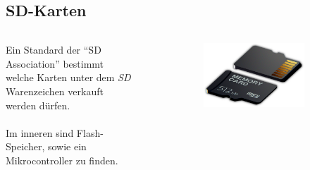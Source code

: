 \documentclass[ngerman]{schoolPres}
\begin{document}
  \subsection{SD-Karten}%
  \begin{frame}
    \begin{columns}[c]
      \begin{column}{.6\linewidth}
        Ein Standard der \enquote{SD Association} bestimmt welche Karten unter dem \emph{SD} Warenzeichen verkauft werden dürfen.\\~\\

        Im inneren sind Flash-Speicher, sowie ein Mikrocontroller zu finden.
      \end{column}
      \begin{column}{.4\linewidth}
        \begin{figure}[!ht]
          \centering
          \begin{subfigure}{.65\linewidth}
            \includegraphics[width=\linewidth]{media/title_edit.jpg}
          \end{subfigure}\vspace{1em}


\end{figure}
\end{column}
\end{columns}
\end{frame}
\end{document}
